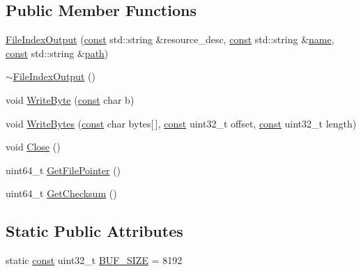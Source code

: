 \subsection*{Public Member Functions}
\begin{DoxyCompactItemize}
\item 
\mbox{\hyperlink{classlucene_1_1core_1_1store_1_1FileIndexOutput_a6e625a7ba4d2b14cc5bcde77fb812e4f}{File\+Index\+Output}} (\mbox{\hyperlink{ZlibCrc32_8h_a2c212835823e3c54a8ab6d95c652660e}{const}} std\+::string \&resource\+\_\+desc, \mbox{\hyperlink{ZlibCrc32_8h_a2c212835823e3c54a8ab6d95c652660e}{const}} std\+::string \&\mbox{\hyperlink{classlucene_1_1core_1_1store_1_1IndexOutput_ab897c3a1151b60666f513e2cb13189d7}{name}}, \mbox{\hyperlink{ZlibCrc32_8h_a2c212835823e3c54a8ab6d95c652660e}{const}} std\+::string \&\mbox{\hyperlink{classlucene_1_1core_1_1store_1_1FileIndexOutput_a4a317430eb3ae95d997dfa94c99e4d96}{path}})
\item 
\mbox{\hyperlink{classlucene_1_1core_1_1store_1_1FileIndexOutput_a3c2f439b5919daf168b757d515422ec9}{$\sim$\+File\+Index\+Output}} ()
\item 
void \mbox{\hyperlink{classlucene_1_1core_1_1store_1_1FileIndexOutput_a7fc2cf6d26931a835104c772b59ffde8}{Write\+Byte}} (\mbox{\hyperlink{ZlibCrc32_8h_a2c212835823e3c54a8ab6d95c652660e}{const}} char b)
\item 
void \mbox{\hyperlink{classlucene_1_1core_1_1store_1_1FileIndexOutput_a7f627b777857d45398afc0b740f036ff}{Write\+Bytes}} (\mbox{\hyperlink{ZlibCrc32_8h_a2c212835823e3c54a8ab6d95c652660e}{const}} char bytes\mbox{[}$\,$\mbox{]}, \mbox{\hyperlink{ZlibCrc32_8h_a2c212835823e3c54a8ab6d95c652660e}{const}} uint32\+\_\+t offset, \mbox{\hyperlink{ZlibCrc32_8h_a2c212835823e3c54a8ab6d95c652660e}{const}} uint32\+\_\+t length)
\item 
void \mbox{\hyperlink{classlucene_1_1core_1_1store_1_1FileIndexOutput_ae07d09f8fa61109e46f069a138f8560b}{Close}} ()
\item 
uint64\+\_\+t \mbox{\hyperlink{classlucene_1_1core_1_1store_1_1FileIndexOutput_a90285cfaf578ecc82e20f1717b76b320}{Get\+File\+Pointer}} ()
\item 
uint64\+\_\+t \mbox{\hyperlink{classlucene_1_1core_1_1store_1_1FileIndexOutput_a4821aaf7a274e515eac0a3877de046fb}{Get\+Checksum}} ()
\end{DoxyCompactItemize}
\subsection*{Static Public Attributes}
\begin{DoxyCompactItemize}
\item 
static \mbox{\hyperlink{ZlibCrc32_8h_a2c212835823e3c54a8ab6d95c652660e}{const}} uint32\+\_\+t \mbox{\hyperlink{classlucene_1_1core_1_1store_1_1FileIndexOutput_a9cd3556c39e4acef7fea5da7723579a5}{B\+U\+F\+\_\+\+S\+I\+ZE}} = 8192
\end{DoxyCompactItemize}
